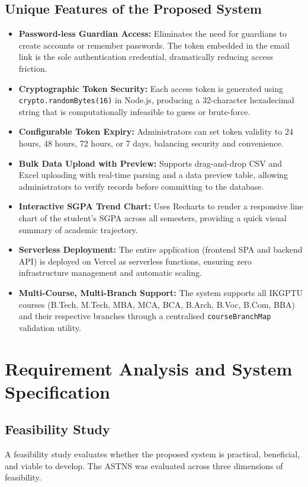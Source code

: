 \documentclass[12pt,a4paper]{report}
\begin{document}
\section{Unique Features of the Proposed System}
\begin{itemize}
  \item \textbf{Password-less Guardian Access:} Eliminates the need for guardians to create accounts or remember passwords. The token embedded in the email link is the sole authentication credential, dramatically reducing access friction.
  \item \textbf{Cryptographic Token Security:} Each access token is generated using \texttt{crypto.randomBytes(16)} in Node.js, producing a 32-character hexadecimal string that is computationally infeasible to guess or brute-force.
  \item \textbf{Configurable Token Expiry:} Administrators can set token validity to 24 hours, 48 hours, 72 hours, or 7 days, balancing security and convenience.
  \item \textbf{Bulk Data Upload with Preview:} Supports drag-and-drop CSV and Excel uploading with real-time parsing and a data preview table, allowing administrators to verify records before committing to the database.
  \item \textbf{Interactive SGPA Trend Chart:} Uses Recharts to render a responsive line chart of the student's SGPA across all semesters, providing a quick visual summary of academic trajectory.
  \item \textbf{Serverless Deployment:} The entire application (frontend SPA and backend API) is deployed on Vercel as serverless functions, ensuring zero infrastructure management and automatic scaling.
  \item \textbf{Multi-Course, Multi-Branch Support:} The system supports all IKGPTU courses (B.Tech, M.Tech, MBA, MCA, BCA, B.Arch, B.Voc, B.Com, BBA) and their respective branches through a centralised \texttt{courseBranchMap} validation utility.
\end{itemize}

\chapter{Requirement Analysis and System Specification}

\section{Feasibility Study}
A feasibility study evaluates whether the proposed system is practical, beneficial, and viable to develop. The ASTNS was evaluated across three dimensions of feasibility.
\end{document}
